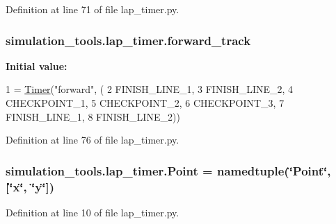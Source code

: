 Definition at line 71 of file lap\+\_\+timer.\+py.

\subsubsection[{\texorpdfstring{forward\+\_\+track}{forward_track}}]{\setlength{\rightskip}{0pt plus 5cm}simulation\+\_\+tools.\+lap\+\_\+timer.\+forward\+\_\+track}\hypertarget{namespacesimulation__tools_1_1lap__timer_aab75b520d524490f7b0bdcf6b28761a6}{}\label{namespacesimulation__tools_1_1lap__timer_aab75b520d524490f7b0bdcf6b28761a6}
{\bfseries Initial value\+:}
\begin{DoxyCode}
1 = \hyperlink{classsimulation__tools_1_1lap__timer_1_1_timer}{Timer}(\textcolor{stringliteral}{"forward"}, (
2     FINISH\_LINE\_1,
3     FINISH\_LINE\_2,
4     CHECKPOINT\_1,
5     CHECKPOINT\_2,
6     CHECKPOINT\_3,
7     FINISH\_LINE\_1,
8     FINISH\_LINE\_2))
\end{DoxyCode}


Definition at line 76 of file lap\+\_\+timer.\+py.

\subsubsection[{\texorpdfstring{Point}{Point}}]{\setlength{\rightskip}{0pt plus 5cm}simulation\+\_\+tools.\+lap\+\_\+timer.\+Point = namedtuple(\char`\"{}Point\char`\"{}, \mbox{[}\char`\"{}x\char`\"{}, \char`\"{}y\char`\"{}\mbox{]})}\hypertarget{namespacesimulation__tools_1_1lap__timer_a55d342023a9bdc266a2ee262040e8d19}{}\label{namespacesimulation__tools_1_1lap__timer_a55d342023a9bdc266a2ee262040e8d19}


Definition at line 10 of file lap\+\_\+timer.\+py.

